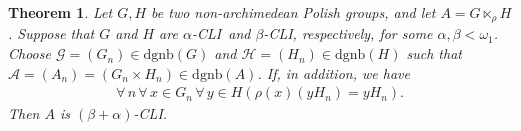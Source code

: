 \documentclass[11pt]{amsart}
\newtheorem{theorem}{Theorem}[section]
\theoremstyle{definition}
\theoremstyle{remark}
\numberwithin{equation}{section}
\def\dgnb{{\mathrm{dgnb}}}
\def\hier#1{$#1$-CLI}
\begin{document}
\begin{theorem}\label{positive answer for semidirect product}
    Let $G,H$ be two non-archimedean Polish groups, and let $A=G\ltimes_\rho H$. Suppose that $G$ and $H$ are \hier\alpha\ and \hier\beta, respectively, for some $\alpha,\beta<\omega_1$. Choose $\mathcal{G}=(G_n)\in\dgnb(G)$ and $\mathcal{H}=(H_n)\in\dgnb(H)$ such that $\mathcal{A}=(A_n)=(G_n\times H_n)\in\dgnb(A)$. If, in addition, we have
    \begin{equation}
    \begin{aligned}
        \forall\,n\,\forall\,x\in G_n\,\forall\,y\in H\left(\rho(x)(yH_n)=yH_n\right).
    \end{aligned}
    \label{addition condition}
    \end{equation}
    Then $A$ is \hier{(\beta+\alpha)}.
\end{theorem}
\end{document}
